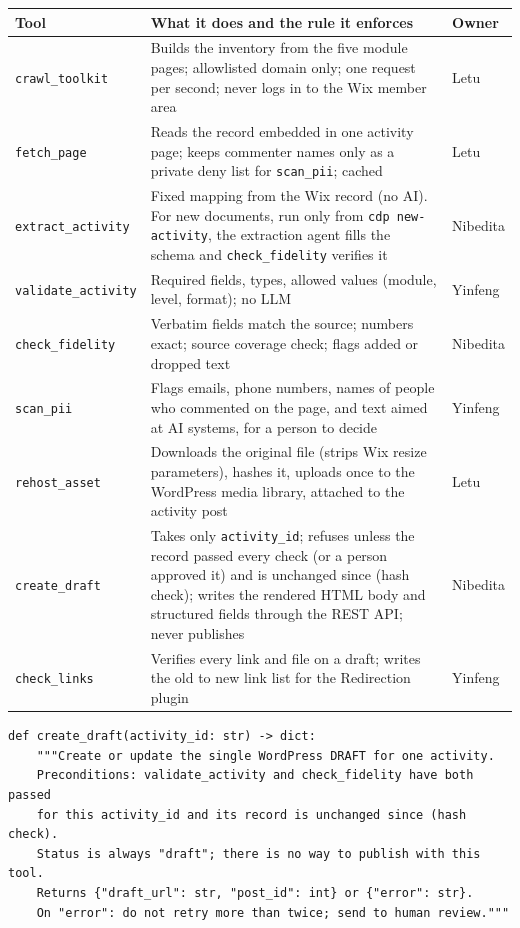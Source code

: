 \begin{tabularx}{\textwidth}{@{}P{3.5cm}LP{1.8cm}@{}}
\toprule
\textbf{Tool} & \textbf{What it does and the rule it enforces} & \textbf{Owner} \\
\midrule
\texttt{crawl\_toolkit} & Builds the inventory from the five module pages; allowlisted domain only; one request per second; never logs in to the Wix member area & Letu \\
\texttt{fetch\_page} & Reads the record embedded in one activity page; keeps commenter names only as a private deny list for \texttt{scan\_pii}; cached & Letu \\
\texttt{extract\_activity} & Fixed mapping from the Wix record (no AI). For new documents, run only from \texttt{cdp new-activity}, the extraction agent fills the schema and \texttt{check\_fidelity} verifies it & Nibedita \\
\texttt{validate\_activity} & Required fields, types, allowed values (module, level, format); no LLM & Yinfeng \\
\texttt{check\_fidelity} & Verbatim fields match the source; numbers exact; source coverage check; flags added or dropped text & Nibedita \\
\texttt{scan\_pii} & Flags emails, phone numbers, names of people who commented on the page, and text aimed at AI systems, for a person to decide & Yinfeng \\
\texttt{rehost\_asset} & Downloads the original file (strips Wix resize parameters), hashes it, uploads once to the WordPress media library, attached to the activity post & Letu \\
\texttt{create\_draft} & Takes only \texttt{activity\_id}; refuses unless the record passed every check (or a person approved it) and is unchanged since (hash check); writes the rendered HTML body and structured fields through the REST API; never publishes & Nibedita \\
\texttt{check\_links} & Verifies every link and file on a draft; writes the old to new link list for the Redirection plugin & Yinfeng \\
\bottomrule
\end{tabularx}

\begin{lstlisting}
def create_draft(activity_id: str) -> dict:
    """Create or update the single WordPress DRAFT for one activity.
    Preconditions: validate_activity and check_fidelity have both passed
    for this activity_id and its record is unchanged since (hash check).
    Status is always "draft"; there is no way to publish with this tool.
    Returns {"draft_url": str, "post_id": int} or {"error": str}.
    On "error": do not retry more than twice; send to human review."""
\end{lstlisting}

